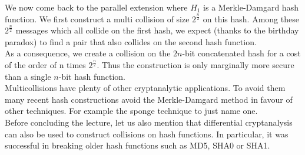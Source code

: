 			We now come back to the parallel extension where $H_1$ is a Merkle-Damgard hash function. 
			We first construct a multi collision of size $2^{\frac{n}{2}}$ on this hash. 
			Among these $2^{\frac{n}{2}}$ messages which all collide on the first hash, we expect (thanks to the birthday paradox) to find a pair that also collides on the second hash function.\\
			As a consequence, we create a collision on the $2n$-bit concatenated hash for a cost of the order of n times $2^{\frac{n}{2}}$. 
			Thus the construction is only marginally more secure than a single $n$-bit hash function.\\
			Multicollisions have plenty of other cryptanalytic applications. 
			To avoid them many recent hash constructions avoid the Merkle-Damgard method in favour of other techniques. 
			For example the sponge technique to just name one.\\
			
			Before concluding the lecture, let us also mention that differential cryptanalysis can also be used to construct collisions on hash functions. 
			In particular, it was successful in breaking older hash functions such as MD5, SHA0 or SHA1.







